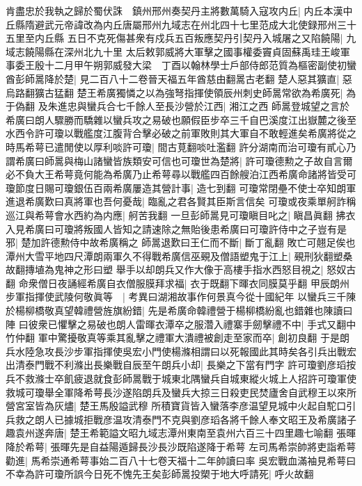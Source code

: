 肯盡忠於我執之歸於蜀伏誅　鎮州邢州奏契丹主將數萬騎入寇攻内丘|{
	内丘本漢中丘縣隋避武元帝諱改為内丘唐屬邢州九域志在州北四十七里范成大北使録邢州三十五里至内丘縣}
五日不克死傷甚衆有戍兵五百叛應契丹引契丹入城屠之又陷饒陽|{
	九域志饒陽縣在深州北九十里}
太后敕郭威將大軍擊之國事權委竇貞固蘇禹珪王峻軍事委王殷十二月甲午朔郭威發大梁　丁酉以翰林學士戶部侍郎范質為樞密副使初蠻酋彭師暠降於楚|{
	見二百八十二卷晉天福五年酋慈由翻暠古老翻}
楚人惡其獷直|{
	惡烏路翻獷古猛翻}
楚王希廣獨憐之以為強弩指揮使領辰州刺史師暠常欲為希廣死|{
	為于偽翻}
及朱進忠與蠻兵合七千餘人至長沙營於江西|{
	湘江之西}
師暠登城望之言於希廣曰朗人驟勝而驕雜以蠻兵攻之易破也願假臣步卒三千自巴溪度江出嶽麓之後至水西令許可瓊以戰艦度江腹背合擊必破之前軍敗則其大軍自不敢輕進矣希廣將從之時馬希萼已遣閒使以厚利啖許可瓊|{
	間古莧翻啖吐濫翻}
許分湖南而治可瓊有貳心乃謂希廣曰師暠與梅山諸蠻皆族類安可信也可瓊世為楚將|{
	許可瓊德勲之子故自言爾}
必不負大王希萼竟何能為希廣乃止希萼尋以戰艦四百餘艘泊江西希廣命諸將皆受可瓊節度日賜可瓊銀伍百兩希廣屢造其營計事|{
	造七到翻}
可瓊常閉壘不使士卒知朗軍進退希廣歎曰真將軍也吾何憂哉|{
	臨亂之君各賢其臣斯言信矣}
可瓊或夜乘單舸詐稱巡江與希萼會水西約為内應|{
	舸苦我翻}
一旦彭師暠見可瓊瞋目叱之|{
	瞋昌眞翻}
拂衣入見希廣曰可瓊將叛國人皆知之請速除之無貽後患希廣曰可瓊許侍中之子豈有是邪|{
	楚加許德勲侍中故希廣稱之}
師暠退歎曰王仁而不斷|{
	斷丁亂翻}
敗亡可翹足俟也潭州大雪平地四尺潭朗兩軍久不得戰希廣信巫覡及僧語塑鬼于江上|{
	覡刑狄翻塑桑故翻摶埴為鬼神之形曰塑}
舉手以却朗兵又作大像于高樓手指水西怒目視之|{
	怒奴古翻}
命衆僧日夜誦經希廣自衣僧服膜拜求福|{
	衣于既翻下暉衣同膜莫乎翻}
甲辰朗州步軍指揮使武陵何敬眞等　|{
	考異曰湖湘故事作何景真今從十國紀年}
以蠻兵三千陳於楊柳橋敬真望韓禮營旌旗紛錯|{
	先是希廣命韓禮營于楊柳橋紛亂也錯雜也陳讀曰陣}
曰彼衆已懼擊之易破也朗人雷暉衣潭卒之服濳入禮寨手劒擊禮不中|{
	手式又翻中竹仲翻}
軍中驚擾敬真等乘其亂擊之禮軍大潰禮被創走至家而卒|{
	創初良翻}
于是朗兵水陸急攻長沙步軍指揮使吳宏小門使楊滌相謂曰以死報國此其時矣各引兵出戰宏出清泰門戰不利滌出長樂戰自辰至午朗兵小却|{
	長樂之下當有門字}
許可瓊劉彦瑫按兵不救滌士卒飢疲退就食彭師暠戰于城東北隅蠻兵自城東縱火城上人招許可瓊軍使救城可瓊舉全軍降希萼長沙遂陷朗兵及蠻兵大掠三日殺吏民焚廬舍自武穆王以來所營宮室皆為灰燼|{
	楚王馬殷謚武穆}
所積寶貨皆入蠻落李彦温望見城中火起自駝口引兵救之朗人已據城拒戰彦温攻清泰門不克與劉彦瑫各將千餘人奉文昭王及希廣諸子趣袁州遂奔唐|{
	楚王希範謚文昭九域志潭州東南至袁州六百三十四里趣七喻翻}
張暉降於希萼|{
	張暉先是自益陽遁歸長沙長沙既陷遂降于希萼}
左司馬希崇帥將吏詣希萼勸進|{
	馬希崇通希萼事始二百八十七卷天福十二年帥讀曰率}
吳宏戰血滿袖見希萼曰不幸為許可瓊所誤今日死不愧先王矣彭師暠投槊于地大呼請死|{
	呼火故翻}
